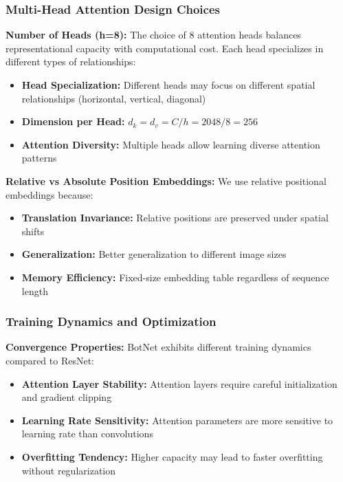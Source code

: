 \documentclass[a4paper,12pt]{article}
\begin{document}
\subsubsection{Multi-Head Attention Design Choices}

\textbf{Number of Heads (h=8):}
The choice of 8 attention heads balances representational capacity with computational cost. Each head specializes in different types of relationships:
\begin{itemize}
    \item \textbf{Head Specialization:} Different heads may focus on different spatial relationships (horizontal, vertical, diagonal)
    \item \textbf{Dimension per Head:} $d_k = d_v = C/h = 2048/8 = 256$
    \item \textbf{Attention Diversity:} Multiple heads allow learning diverse attention patterns
\end{itemize}

\textbf{Relative vs Absolute Position Embeddings:}
We use relative positional embeddings because:
\begin{itemize}
    \item \textbf{Translation Invariance:} Relative positions are preserved under spatial shifts
    \item \textbf{Generalization:} Better generalization to different image sizes
    \item \textbf{Memory Efficiency:} Fixed-size embedding table regardless of sequence length
\end{itemize}

\subsubsection{Training Dynamics and Optimization}

\textbf{Convergence Properties:}
BotNet exhibits different training dynamics compared to ResNet:
\begin{itemize}
    \item \textbf{Attention Layer Stability:} Attention layers require careful initialization and gradient clipping
    \item \textbf{Learning Rate Sensitivity:} Attention parameters are more sensitive to learning rate than convolutions
    \item \textbf{Overfitting Tendency:} Higher capacity may lead to faster overfitting without regularization
\end{itemize}
\end{document}
